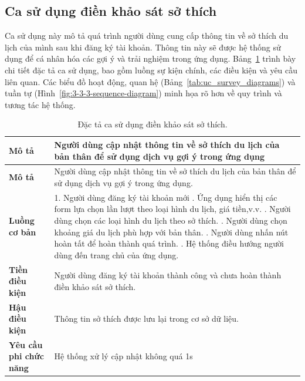 \subsection{Ca sử dụng điền khảo sát sở thích}
\noindent Ca sử dụng này mô tả quá trình người dùng cung cấp thông tin về sở thích du lịch của mình sau khi đăng ký tài khoản. Thông tin này sẽ được hệ thống sử dụng để cá nhân hóa các gợi ý và trải nghiệm trong ứng dụng. Bảng~\ref{tab:uc_survey_spec} trình bày chi tiết đặc tả ca sử dụng, bao gồm luồng sự kiện chính, các điều kiện và yêu cầu liên quan. Các biểu đồ hoạt động, quan hệ (Bảng~\ref{tab:uc_survey_diagrams}) và tuần tự (Hình~\ref{fig:3-3-3-sequence-diagram}) minh họa rõ hơn về quy trình và tương tác hệ thống.

\begin{longtable}{| p{4cm} | p{\dimexpr\linewidth-4cm-4\tabcolsep} |} %
    \caption{Đặc tả ca sử dụng điền khảo sát sở thích.} %
    \label{tab:uc_survey_spec} \\ %

    \hline
    \textbf{Mô tả} & Người dùng cập nhật thông tin về sở thích du lịch của bản thân để sử dụng dịch vụ gợi ý trong ứng dụng \\
    \hline
    \endfirsthead %

    \hline
 
    \textbf{Mô tả} & Người dùng cập nhật thông tin về sở thích du lịch của bản thân để sử dụng dịch vụ gợi ý trong ứng dụng. \\
    \hline
    \endhead

    \hline 
    \endfoot

    \hline %
    \endlastfoot

    \textbf{Luồng cơ bản} & 1. Người dùng đăng ký tài khoản mới \newline
                           2. Ứng dụng hiển thị các form lựa chọn lần lượt theo loại hình du lịch, giá tiền,v.v. \newline
                           3. Người dùng chọn các loại hình du lịch theo sở thích. \newline
                           4. Người dùng chọn khoảng giá du lịch phù hợp với bản thân. \newline
                           5. Người dùng nhấn nút hoàn tất để hoàn thành quá trình. \newline
                           6. Hệ thống điều hướng người dùng đến trang chủ của ứng dụng. \\
    \hline
    \textbf{Tiền điều kiện} & Người dùng đăng ký tài khoản thành công và chưa hoàn thành điền khảo sát sở thích. \\
    \hline
    \textbf{Hậu điều kiện} & Thông tin sở thích được lưu lại trong cơ sở dữ liệu. \\
    \hline
    \textbf{Yêu cầu phi chức năng} & Hệ thống xử lý cập nhật không quá 1s \\

\end{longtable}


